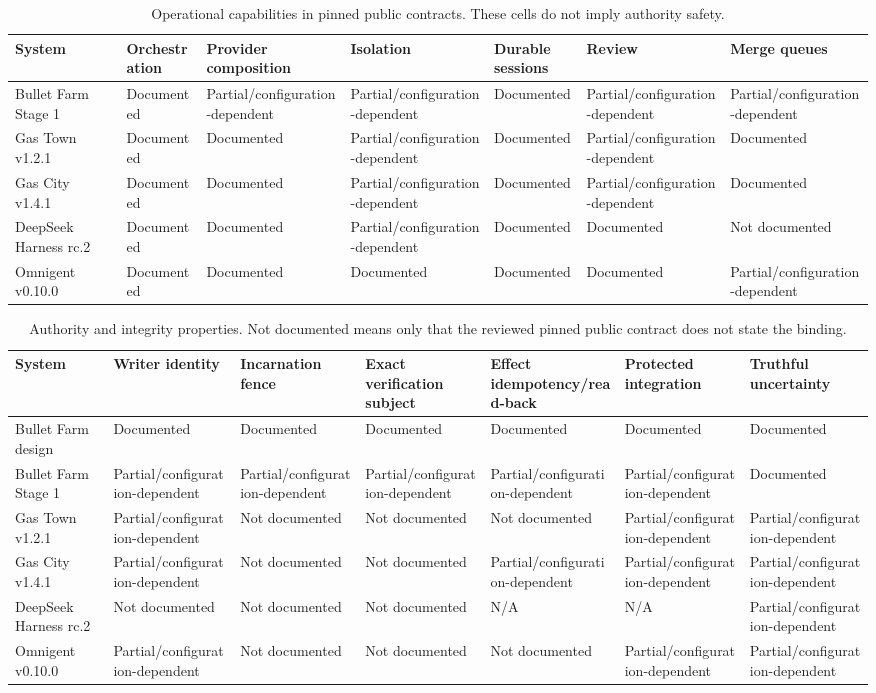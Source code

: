 \documentclass[journal]{IEEEtran}
\newcommand{\Doc}{\textsf{Documented}}
\newcommand{\Partial}{\textsf{Partial/configuration-dependent}}
\newcommand{\NotDoc}{\textsf{Not documented}}
\newcommand{\NA}{\textsf{N/A}}
\begin{document}
\begin{table}[!t]
\caption{Operational capabilities in pinned public contracts. These cells do not imply authority safety.}
\label{tab:operations}
\centering
\scriptsize
\setlength{\tabcolsep}{3pt}
\begin{tabularx}{\textwidth}{@{}p{}XXXXXX@{}}
\toprule
System & Orchestration & Provider composition & Isolation & Durable sessions & Review & Merge queues \\
\midrule
Bullet Farm Stage 1~\cite{bulletOverview,bulletClosure} & \Doc & \Partial & \Partial & \Doc & \Partial & \Partial \\
Gas Town v1.2.1~\cite{gastownReadme,gastownV121} & \Doc & \Doc & \Partial & \Doc & \Partial & \Doc \\
Gas City v1.4.1~\cite{gascityReadme,gascityV141} & \Doc & \Doc & \Partial & \Doc & \Partial & \Doc \\
DeepSeek Harness rc.2~\cite{dshArch,dshTeams} & \Doc & \Doc & \Partial & \Doc & \Doc & \NotDoc \\
Omnigent v0.10.0~\cite{omnigentReadme,omnigentPolly} & \Doc & \Doc & \Doc & \Doc & \Doc & \Partial \\
\bottomrule
\end{tabularx}
\end{table}

\begin{table}[!t]
\caption{Authority and integrity properties. \NotDoc{} means only that the reviewed pinned public contract does not state the binding.}
\label{tab:integrity}
\centering
\scriptsize
\setlength{\tabcolsep}{3pt}
\begin{tabularx}{\textwidth}{@{}p{}XXXXXX@{}}
\toprule
System & Writer identity & Incarnation fence & Exact verification subject & Effect idempotency/read-back & Protected integration & Truthful uncertainty \\
\midrule
Bullet Farm design~\cite{bulletOverview} & \Doc & \Doc & \Doc & \Doc & \Doc & \Doc \\
Bullet Farm Stage 1~\cite{bulletClosure,bulletRelease} & \Partial & \Partial & \Partial & \Partial & \Partial & \Doc \\
Gas Town v1.2.1~\cite{gastownReadme,gastownV121} & \Partial & \NotDoc & \NotDoc & \NotDoc & \Partial & \Partial \\
Gas City v1.4.1~\cite{gascityReadme,gascityV141} & \Partial & \NotDoc & \NotDoc & \Partial & \Partial & \Partial \\
DeepSeek Harness rc.2~\cite{dshArch,dshTeams} & \NotDoc & \NotDoc & \NotDoc & \NA & \NA & \Partial \\
Omnigent v0.10.0~\cite{omnigentReadme,omnigentPolicy} & \Partial & \NotDoc & \NotDoc & \NotDoc & \Partial & \Partial \\
\bottomrule
\end{tabularx}
\end{table}
\end{document}
